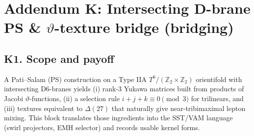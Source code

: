 \documentclass[11pt]{article}
\begin{document}
  \titlepageOpen

  \begin{abstract}


  \end{abstract}

  \titlepageClose
  \fi

  \ifdefined\standalonechapter
  \section{\papertitle}
  \else
  \fi



  \section*{Addendum K: Intersecting D-brane PS \& $\vartheta$-texture bridge (bridging)}

      \subsection*{K1. Scope and payoff}
          A Pati–Salam (PS) construction on a Type IIA $T^6/(\mathbb Z_2\times \mathbb Z_2)$ orientifold with intersecting D6-branes yields
          (i) rank-3 Yukawa matrices built from products of Jacobi $\vartheta$-functions,
          (ii) a selection rule $i{+}j{+}k\equiv 0 \pmod{3}$ for trilinears, and
          (iii) textures equivalent to $\Delta(27)$ that naturally give near-tribimaximal lepton mixing.
          This block translates those ingredients into the SST/VAM language (swirl projectors, EMH selector) and records usable kernel forms.
\end{document}
